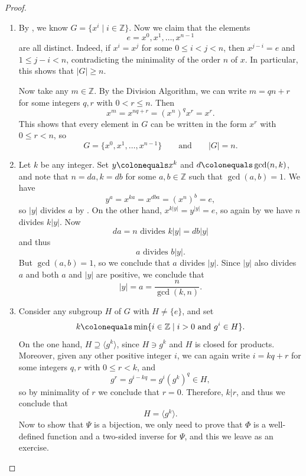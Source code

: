 \documentclass[12pt]{report}
\numberwithin{equation}{section}
\numberwithin{theorem}{chapter}
\theoremstyle{definition}
\newtheorem*{basic properties}{Basic Properties}
\newtheorem*{Important Remark}{Important Remark}
\newcommand{\Z}{\mathbb{Z}}
\begin{document}
\begin{proof}
\begin{enumerate}[label=(\alph*)]
\item By , we know $G=\{x^i \mid i \in \Z\}$. Now we claim that the elements 
$$e = x^0, x^1, \dots, x^{n-1}$$ 
are all distinct. Indeed, if $x^i=x^j$ for some $0\leqslant i<j<n$, then $x^{j-i}=e$ and $1 \leqslant j-i<n$, contradicting the minimality of the order $n$ of $x$. In particular, this shows that $|G| \geqslant n$.

Now take any $m \in \Z$. By the Division Algorithm, we can write $m = qn+r$ for some integers $q, r$ with $0 < r \leqslant n$. Then 
$$x^m=x^{nq+r}=(x^n)^qx^r=x^r.$$
This shows that every element in $G$ can be written in the form $x^r$ with $0 \leqslant r < n$, so
$$G = \{x^0, x^1, \dots, x^{n-1}\} \qquad \textrm{and} \qquad |G| = n.$$

\item Let $k$ be any integer. Set $y \colonequals x^k$ and $d \colonequals \gcd(n,k)$, and note that $n=da, k=db$ for some $a,b\in \Z$ such that $\gcd(a,b)=1$. 
We have
$$y^a=x^{ka}=x^{dba}=(x^n)^b=e,$$ 
so $|y|$ divides $a$ by . On the other hand, $x^{k|y|}=y^{|y|}=e$, so again by  we have $n$ divides $k|y|$. 
Now
$$da = n \textrm{ divides } k|y| = db|y|$$
and thus
$$a \textrm{ divides } b|y|.$$
But $\gcd(a,b)=1$, so we conclude that $a$ divides $|y|$.
Since $|y|$ also divides $a$ and both $a$ and $|y|$ are positive, we conclude that 
$$|y|=a=\frac{n}{\gcd(k,n)}.$$


\item Consider any subgroup $H$ of $G$ with $H \neq \{ e \}$, and set 
$$k \colonequals \min \{i \in \Z \mid i>0 \textrm{ and } g^i\in H\}.$$ 
On the one hand, $H \supseteq \langle g^k \rangle$, since $H \ni g^k$ and $H$ is closed for products. Moreover, given any other positive integer $i$, we can again write $i = kq+r$ for some integers $q, r$ with $0 \leqslant r < k$, and
$$g^r = g^{i-kq} = g^i (g^k)^q \in H,$$
so by minimality of $r$ we conclude that $r = 0$. Therefore, $k | r$, and thus we conclude that
$$H = \langle g^k \rangle.$$
Now to show that $\Psi$ is a bijection, we only need to prove that $\Phi$ is a well-defined function and a two-sided inverse for $\Psi$, and this we leave as an exercise.\qedhere
\end{enumerate}
\end{proof}
\end{document}

